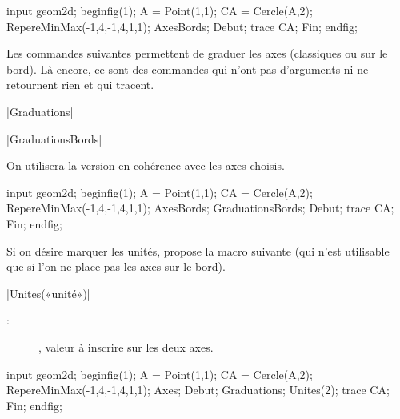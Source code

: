 \documentclass[a4paper,french]{article}
\begin{document}
\begin{ExempleMP}
input geom2d;
beginfig(1);
A = Point(1,1);
CA = Cercle(A,2);
RepereMinMax(-1,4,-1,4,1,1);
AxesBords;
Debut;
trace CA;
Fin;
endfig;
\end{ExempleMP}

Les commandes suivantes permettent de graduer les axes (classiques ou sur le
bord). Là encore, ce sont des commandes qui n'ont pas d'arguments ni ne
retournent rien et qui tracent.

\begin{colourband}
\macro|Graduations|
\end{colourband}


\begin{colourband}
\macro|GraduationsBords|
\end{colourband}

On utilisera la version en cohérence avec les axes choisis.

\begin{ExempleMP}
input geom2d;
beginfig(1);
A = Point(1,1);
CA = Cercle(A,2);
RepereMinMax(-1,4,-1,4,1,1);
AxesBords;
GraduationsBords;
Debut;
trace CA;
Fin;
endfig;
\end{ExempleMP}

Si on désire marquer les unités, \mpgeomdd{} propose la macro suivante (qui n'est
utilisable que si l'on ne place pas les axes sur le bord).
\begin{colourband}
\macro|Unites(«unité»)|
\begin{description}
  \item[:] , valeur à inscrire sur les deux axes.
\end{description}
\end{colourband}

\begin{ExempleMP}
input geom2d;
beginfig(1);
A = Point(1,1);
CA = Cercle(A,2);
RepereMinMax(-1,4,-1,4,1,1);
Axes;
Debut;
  Graduations;
  Unites(2);
  trace CA;
Fin;
endfig;
\end{ExempleMP}
\end{document}
